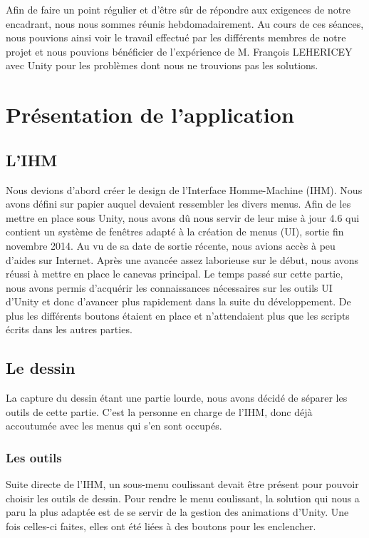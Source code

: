 \documentclass[a4paper,11pt]{article}
\begin{document}
	Afin de faire un point régulier et d'être sûr de répondre aux exigences de notre encadrant, nous nous sommes réunis hebdomadairement. Au cours de ces séances, nous pouvions ainsi voir le travail effectué par les différents membres de notre projet et nous pouvions bénéficier de l'expérience de M. François LEHERICEY avec Unity pour les problèmes dont nous ne trouvions pas les solutions.
	\section{Présentation de l'application}
		\subsection{L'IHM}
			Nous devions d'abord créer le design de l'Interface Homme-Machine (IHM). Nous avons défini sur papier auquel devaient ressembler les divers menus. Afin de les mettre en place sous Unity, nous avons dû nous servir de leur mise à jour 4.6 qui contient un système de fenêtres adapté à la création de menus (UI), sortie fin novembre 2014. Au vu de sa date de sortie récente, nous avions accès à peu d'aides sur Internet. Après une avancée assez laborieuse sur le début, nous avons réussi à mettre en place le canevas principal.
			Le temps passé sur cette partie, nous avons permis d'acquérir les connaissances nécessaires sur les outils UI d'Unity et donc d'avancer plus rapidement dans la suite du développement. De plus les différents boutons étaient en place et n'attendaient plus que les scripts écrits dans les autres parties.
		
		\subsection{Le dessin}
			La capture du dessin étant une partie lourde, nous avons décidé de séparer les outils de cette partie. C'est la personne en charge de l'IHM, donc déjà accoutumée avec les menus qui s'en sont occupés.
		
		
			\subsubsection{Les outils}				
				Suite directe de l'IHM, un sous-menu coulissant devait être présent pour pouvoir choisir les outils de dessin. Pour rendre le menu coulissant, la solution qui nous a paru la plus adaptée est de se servir de la gestion des animations d'Unity. Une fois celles-ci faites, elles ont été liées à des boutons pour les enclencher.
					
\end{document}
